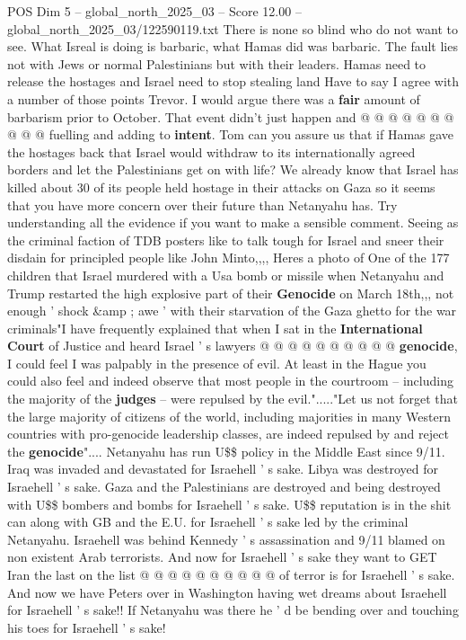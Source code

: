 \begin{textsample}{POS Dim 5 – global\_north\_2025\_03 – Score 12.00 – global\_north\_2025\_03/122590119.txt}
There is none so blind who do not want to see.
What Isreal is doing is barbaric, what Hamas did was barbaric.
The fault lies not with Jews or normal Palestinians but with their leaders.
Hamas need to release the hostages and Israel need to stop stealing land Have to say I agree with a number of those points Trevor.
I would argue there was a \textbf{fair} amount of barbarism prior to October.
That event didn't just happen and @ @ @ @ @ @ @ @ @ @ fuelling and adding to \textbf{intent}.
Tom can you assure us that if Hamas gave the hostages back that Israel would withdraw to its internationally agreed borders and let the Palestinians get on with life?
We already know that Israel has killed about 30 of its people held hostage in their attacks on Gaza so it seems that you have more concern over their future than Netanyahu has.
Try understanding all the evidence if you want to make a sensible comment.
Seeing as the criminal faction of TDB posters like to talk tough for Israel and sneer their disdain for principled people like John Minto,,,, Heres a photo of One of the 177 children that Israel murdered with a Usa bomb or missile when Netanyahu and Trump restarted the high explosive part of their \textbf{Genocide} on March 18th,,, not enough ' shock \&amp ; awe ' with their starvation of the Gaza ghetto for the war criminals"I have frequently explained that when I sat in the \textbf{International} \textbf{Court} of Justice and heard Israel ' s lawyers @ @ @ @ @ @ @ @ @ @ \textbf{genocide}, I could feel I was palpably in the presence of evil.
At least in the Hague you could also feel and indeed observe that most people in the courtroom -- including the majority of the \textbf{judges} -- were repulsed by the evil."....."Let us not forget that the large majority of citizens of the world, including majorities in many Western countries with pro-genocide leadership classes, are indeed repulsed by and reject the \textbf{genocide}"....
Netanyahu has run U\$\$ policy in the Middle East since 9/11.
Iraq was invaded and devastated for Israehell ' s sake.
Libya was destroyed for Israehell ' s sake.
Gaza and the Palestinians are destroyed and being destroyed with U\$\$ bombers and bombs for Israehell ' s sake.
U\$\$ reputation is in the shit can along with GB and the E.U. for Israehell ' s sake led by the criminal Netanyahu.
Israehell was behind Kennedy ' s assassination and 9/11 blamed on non existent Arab terrorists.
And now for Israehell ' s sake they want to GET Iran the last on the list @ @ @ @ @ @ @ @ @ @ of terror is for Israehell ' s sake.
And now we have Peters over in Washington having wet dreams about Israehell for Israehell ' s sake!!
If Netanyahu was there he ' d be bending over and touching his toes for Israehell ' s sake!

\end{textsample}
